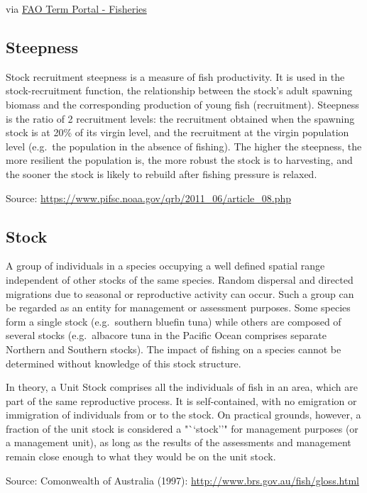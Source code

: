 \documentclass[
  11pt,
]{book}
\begin{document}
via \href{http://www.fao.org/fishery/glossary/en}{FAO Term Portal - Fisheries}

\hypertarget{steepness}{%
\subsection{Steepness}\label{steepness}}

Stock recruitment steepness is a measure of fish productivity. It is used in the stock-recruitment function, the relationship between the stock's adult spawning biomass and the corresponding production of young fish (recruitment). Steepness is the ratio of 2 recruitment levels: the recruitment obtained when the spawning stock is at 20\% of its virgin level, and the recruitment at the virgin population level (e.g.~the population in the absence of fishing). The higher the steepness, the more resilient the population is, the more robust the stock is to harvesting, and the sooner the stock is likely to rebuild after fishing pressure is relaxed.

Source: \url{https://www.pifsc.noaa.gov/qrb/2011_06/article_08.php}

\hypertarget{stock}{%
\subsection{Stock}\label{stock}}

A group of individuals in a species occupying a well defined spatial range independent of other stocks of the same species. Random dispersal and directed migrations due to seasonal or reproductive activity can occur. Such a group can be regarded as an entity for management or assessment purposes. Some species form a single stock (e.g.~southern bluefin tuna) while others are composed of several stocks (e.g.~albacore tuna in the Pacific Ocean comprises separate Northern and Southern stocks). The impact of fishing on a species cannot be determined without knowledge of this stock structure.

In theory, a Unit Stock comprises all the individuals of fish in an area, which are part of the same reproductive process. It is self-contained, with no emigration or immigration of individuals from or to the stock. On practical grounds, however, a fraction of the unit stock is considered a "``stock''" for management purposes (or a management unit), as long as the results of the assessments and management remain close enough to what they would be on the unit stock.

Source: Comonwealth of Australia (1997): \url{http://www.brs.gov.au/fish/gloss.html}
\end{document}
